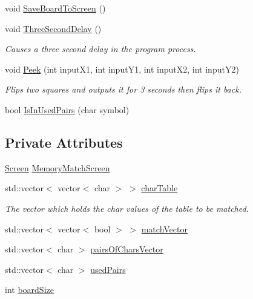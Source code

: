 \begin{DoxyCompactItemize}
void \hyperlink{classMemoryMatch_a6d4c54b56ee4f5b4df36b7767e07ebd5}{Save\-Board\-To\-Screen} ()
\item 
void \hyperlink{classMemoryMatch_a698d59d1b34658bc2266bfe297623690}{Three\-Second\-Delay} ()
\begin{DoxyCompactList}\small\item\em Causes a three second delay in the program process. \end{DoxyCompactList}\item 
void \hyperlink{classMemoryMatch_ae78665422f8d46d0c4639916f494845c}{Peek} (int input\-X1, int input\-Y1, int input\-X2, int input\-Y2)
\begin{DoxyCompactList}\small\item\em Flips two squares and outputs it for 3 seconds then flips it back. \end{DoxyCompactList}\item 
bool \hyperlink{classMemoryMatch_a7f3998ff0f59a063a493156c2d00eca2}{Is\-In\-Used\-Pairs} (char symbol)
\end{DoxyCompactItemize}
\subsection*{Private Attributes}
\begin{DoxyCompactItemize}
\item 
\hyperlink{classScreen}{Screen} \hyperlink{classMemoryMatch_a78399975fec5fea7b2102449a4536fcd}{Memory\-Match\-Screen}
\item 
std\-::vector$<$ vector$<$ char $>$ $>$ \hyperlink{classMemoryMatch_af2437cf6ce06147e64feb7dca23715e7}{char\-Table}
\begin{DoxyCompactList}\small\item\em The vector which holds the char values of the table to be matched. \end{DoxyCompactList}\item 
std\-::vector$<$ vector$<$ bool $>$ $>$ \hyperlink{classMemoryMatch_ac42fc8b5ac8b04bd0651222fa31d2251}{match\-Vector}
\item 
std\-::vector$<$ char $>$ \hyperlink{classMemoryMatch_a80336b0b989152fed590a6fa755197bc}{pairs\-Of\-Chars\-Vector}
\item 
std\-::vector$<$ char $>$ \hyperlink{classMemoryMatch_adcb66679aaceb1414fe023d065863d2f}{used\-Pairs}
\item 
int \hyperlink{classMemoryMatch_aae0a9e51558d70e671fa64aa246de499}{board\-Size}
\end{DoxyCompactItemize}


